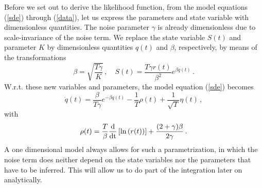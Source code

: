 \documentclass[12pt,a4paper,final]{iopart}
\begin{document}
Before we set out to derive the likelihood function, from the model equations (\ref{sde}) through (\ref{data}), let us express the parameters and state variable with dimensionless quantities.
The noise parameter $\gamma$ is already dimensionless due to scale-invariance of the noise term.
We replace the state variable $S(t)$ and parameter $K$ by dimensionless quantities $q(t)$ and $\beta$, respectively, by means of the transformations
\begin{equation}
  \beta=\sqrt{\frac{T\gamma}{K}}\,,\quad
  S(t)=\frac{T\gamma r(t)}{\beta^2}e^{\beta q(t)}\,.
\end{equation}
W.r.t. these new  variables and parameters, the model equation (\ref{sde}) becomes
\begin{equation}
  \dot q(t)
  =
  \frac{\beta}{T\gamma}e^{-\beta q(t)}
  -
  \frac{1}{T}\rho(t)
  +
  \frac{1}{\sqrt{T}}\eta(t)\,,
\end{equation}
with
\begin{equation}
  \rho(t)
  =
  \frac{T}{\beta}\frac{\mbox d}{\mbox{dt}}\left[ \ln \left( r(t) \right) \right]
  +
  \frac{(2+\gamma)\beta}{2\gamma}\,.
\end{equation}
A one dimensional model always allows for such a parametrization, in which the noise term does neither depend on the state variables nor the parameters that have to be inferred.
This will allow us to do part of the integration later on analytically.
\end{document}
